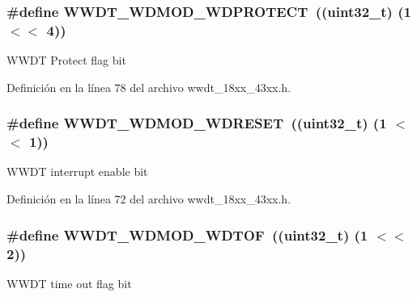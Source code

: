 \subsubsection[{\texorpdfstring{W\+W\+D\+T\+\_\+\+W\+D\+M\+O\+D\+\_\+\+W\+D\+P\+R\+O\+T\+E\+CT}{WWDT_WDMOD_WDPROTECT}}]{\setlength{\rightskip}{0pt plus 5cm}\#define W\+W\+D\+T\+\_\+\+W\+D\+M\+O\+D\+\_\+\+W\+D\+P\+R\+O\+T\+E\+CT~((uint32\+\_\+t) (1 $<$$<$ 4))}\hypertarget{group___w_w_d_t__18_x_x__43_x_x_gac44132c9f40915e405e3cfedc2599586}{}\label{group___w_w_d_t__18_x_x__43_x_x_gac44132c9f40915e405e3cfedc2599586}
W\+W\+DT Protect flag bit 

Definición en la línea 78 del archivo wwdt\+\_\+18xx\+\_\+43xx.\+h.

\subsubsection[{\texorpdfstring{W\+W\+D\+T\+\_\+\+W\+D\+M\+O\+D\+\_\+\+W\+D\+R\+E\+S\+ET}{WWDT_WDMOD_WDRESET}}]{\setlength{\rightskip}{0pt plus 5cm}\#define W\+W\+D\+T\+\_\+\+W\+D\+M\+O\+D\+\_\+\+W\+D\+R\+E\+S\+ET~((uint32\+\_\+t) (1 $<$$<$ 1))}\hypertarget{group___w_w_d_t__18_x_x__43_x_x_gaa6b03ad5df847bc2241c0ea1eefd9431}{}\label{group___w_w_d_t__18_x_x__43_x_x_gaa6b03ad5df847bc2241c0ea1eefd9431}
W\+W\+DT interrupt enable bit 

Definición en la línea 72 del archivo wwdt\+\_\+18xx\+\_\+43xx.\+h.

\subsubsection[{\texorpdfstring{W\+W\+D\+T\+\_\+\+W\+D\+M\+O\+D\+\_\+\+W\+D\+T\+OF}{WWDT_WDMOD_WDTOF}}]{\setlength{\rightskip}{0pt plus 5cm}\#define W\+W\+D\+T\+\_\+\+W\+D\+M\+O\+D\+\_\+\+W\+D\+T\+OF~((uint32\+\_\+t) (1 $<$$<$ 2))}\hypertarget{group___w_w_d_t__18_x_x__43_x_x_ga9379872b1e184e20abf74f1abbdd8cb9}{}\label{group___w_w_d_t__18_x_x__43_x_x_ga9379872b1e184e20abf74f1abbdd8cb9}
W\+W\+DT time out flag bit 

